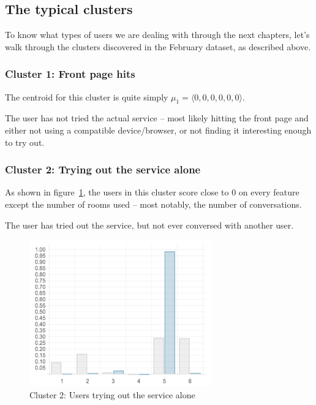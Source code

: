 \subsection{The typical clusters}
\label{sub:typical_clusters}

To know what types of users we are dealing with through the next chapters, let's walk through the clusters discovered in the February dataset, as described above.

\subsubsection{Cluster 1: Front page hits}

The centroid for this cluster is quite simply $\mu_1 = \langle 0, 0, 0, 0, 0, 0 \rangle$.

\begin{persona}
  The user has not tried the actual service -- most likely hitting the front page and either not using a compatible device/browser, or not finding it interesting enough to try out.
\end{persona}

\subsubsection{Cluster 2: Trying out the service alone}

As shown in figure~\ref{fig:cluster2-chart}, the users in this cluster score close to 0 on every feature except the number of rooms used -- most notably, the number of conversations.

\begin{persona}
  The user has tried out the service, but not ever conversed with another user.
\end{persona}

\begin{figure}[h]
  \centering
    \includegraphics[width=0.7\textwidth]{Figures/clusterings/confluence-post/cluster2-chart}
    \caption{Cluster 2: Users trying out the service alone}
    \label{fig:cluster2-chart}
\end{figure}

